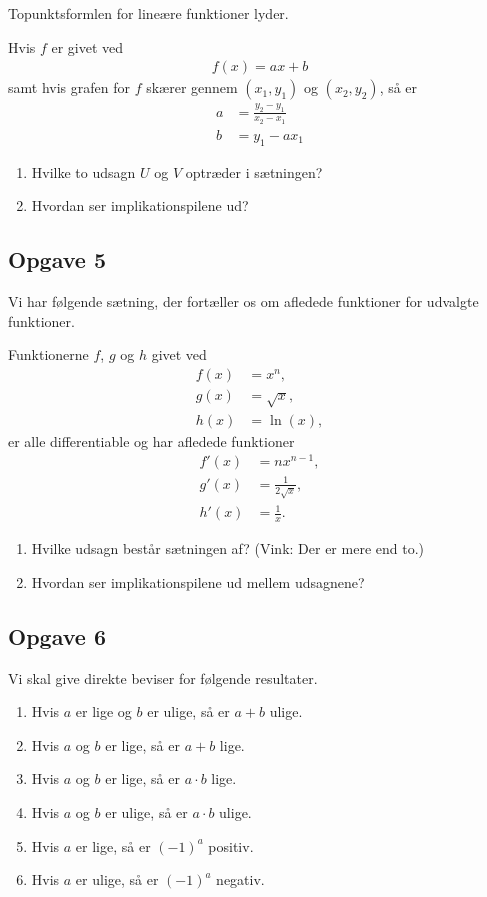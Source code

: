 Topunktsformlen for lineære funktioner lyder.
\begin{setn}
	Hvis $f$ er givet ved
	\begin{align*}
		f(x) = ax+b
	\end{align*}
	samt hvis grafen for $f$ skærer gennem $(x_1,y_1)$ og $(x_2,y_2)$, så er 
	\begin{align*}
		a &= \frac{y_2-y_1}{x_2-x_1} \\
		b &= y_1-ax_1
	\end{align*}
\end{setn}
\begin{enumerate}[label=\roman*)]
	\item Hvilke to udsagn $U$ og $V$ optræder i sætningen? 
	\item Hvordan ser implikationspilene ud?
\end{enumerate}

\subsection*{Opgave 5}
Vi har følgende sætning, der fortæller os om afledede funktioner for udvalgte funktioner. 

\begin{setn}
	Funktionerne $f$, $g$ og $h$ givet ved
	\begin{align*}
		f(x) &= x^n, \\
		g(x) &= \sqrt{x}, \\
		h(x) &= \ln(x),
	\end{align*}
	er alle differentiable og har afledede funktioner
	\begin{align*}
		f'(x) &= nx^{n-1},\\
		g'(x) &= \frac{1}{2\sqrt{x}},\\
		h'(x) &= \frac{1}{x}.
	\end{align*}
\end{setn}
\begin{enumerate}[label = \roman*)]
	\item Hvilke udsagn består sætningen af? (Vink: Der er mere end to.)
	\item Hvordan ser implikationspilene ud mellem udsagnene?
\end{enumerate}

\newpage

\subsection*{Opgave 6}
Vi skal give direkte beviser for følgende resultater.
\begin{enumerate}[label=\roman*)]
	\item Hvis $a$ er lige og $b$ er ulige, så er $a+b$ ulige.
	\item Hvis $a$ og $b$ er lige, så er $a + b$ lige.
	\item Hvis $a$ og $b$ er lige, så er $a\cdot b$ lige.
	\item Hvis $a$ og $b$ er ulige, så er $a\cdot b$ ulige.
	\item Hvis $a$ er lige, så er $(-1)^a$ positiv.
	\item Hvis $a$ er ulige, så er $(-1)^a$ negativ.
\end{enumerate}